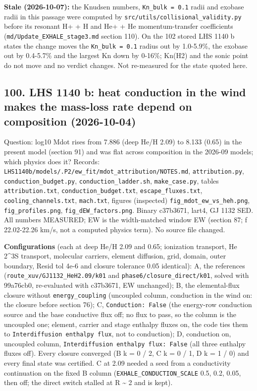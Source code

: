 \documentclass[english,a4paper]{my_memo}
\begin{document}
\textbf{Stale (2026-10-07):} the Knudsen numbers, \texttt{Kn\_bulk\ =\ 0.1} radii and exobase radii in this passage were computed by \texttt{src/utils/collisional\_validity.py} before its resonant H+ + H and He+ + He momentum-transfer coefficients (\texttt{md/Update\_EXHALE\_stage3.md} section 110). On the 102 stored LHS 1140 b states the change moves the \texttt{Kn\_bulk\ =\ 0.1} radius out by 1.0-5.9\%, the exobase out by 0.4-5.7\% and the largest Kn down by 0-16\%; Kn(H2) and the sonic point do not move and no verdict changes. Not re-measured for the state quoted here.

\subsection{100. LHS 1140 b: heat conduction in the wind makes the mass-loss rate depend on composition (2026-10-04)}\label{100-lhs-1140-b-heat-conduction-in-the-wind-makes-the-mass-loss-rate-depend-on-composition-2026-10-04}

Question: log10 Mdot rises from 7.886 (deep He/H 2.09) to 8.133 (0.65) in
the present model (section 91) and was flat across composition in the
2026-09 models; which physics does it? Records:
\texttt{LHS1140b/models/.P2/ew\_fit/mdot\_attribution/NOTES.md}, \texttt{attribution.py},
\texttt{conduction\_budget.py}, \texttt{conduction\_ladder.sh}, \texttt{make\_case.py}, tables
\texttt{attribution.txt}, \texttt{conduction\_budget.txt}, \texttt{escape\_fluxes.txt},
\texttt{cooling\_channels.txt}, \texttt{mach.txt}, figures (inspected)
\texttt{fig\_mdot\_ew\_vs\_heh.png}, \texttt{fig\_profiles.png}, \texttt{fig\_dEW\_factors.png}. Binary
c37b3671, lart4, GJ 1132 SED. All numbers MEASURED; EW is the width-matched
window EW (section 87; f 22.02-22.26 km/s, not a computed physics term). No
source file changed.

\textbf{Configurations} (each at deep He/H 2.09 and 0.65; ionization transport,
He 2\^{}3S transport, molecular carriers, element diffusion, grid, domain,
outer boundary, Resid tol 4e-6 and closure tolerance 0.05 identical): A,
the references (\texttt{route\_xuv/GJ1132\_HeH2.09/k01} and
\texttt{phase6/closure\_direct/k01}, solved with 99a76cb0, re-evaluated with
c37b3671, EW unchanged); B, the elemental-flux closure without
\texttt{energy\_coupling} (uncoupled column, conduction in the wind on: the closure
before section 76); C, \texttt{Conduction:\ False} (the energy-row conduction
source and the base conductive flux off; no flux to pass, so the column is
the uncoupled one; element, carrier and stage enthalpy fluxes on, the code
ties them to \texttt{Interdiffusion\ enthalpy\ flux}, not to conduction); D,
conduction on, uncoupled column, \texttt{Interdiffusion\ enthalpy\ flux:\ False}
(all three enthalpy fluxes off). Every closure converged (B k = 0 / 2, C
k = 0 / 1, D k = 1 / 0) and every final state was certified. C at 2.09
needed a seed from a conductivity continuation on the fixed B column
(\texttt{EXHALE\_CONDUCTION\_SCALE} 0.5, 0.2, 0.05, then off; the direct switch
stalled at \textbar\textbar R\textbar\textbar{} \textasciitilde{} 2 and is kept).
\end{document}
